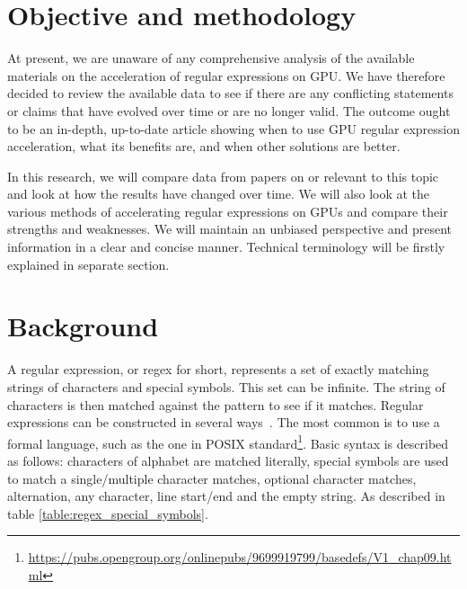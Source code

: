 \documentclass[10pt,onecolumn,twoside,english,a4paper]{article}
\begin{document}
\section{Objective and methodology} \label{Objective}
At present, we are unaware of any comprehensive analysis of the available materials on the acceleration of regular expressions on GPU. We have therefore decided to review the available data to see if there are any conflicting statements or claims that have evolved over time or are no longer valid. The outcome ought to be an in-depth, up-to-date article showing when to use GPU regular expression acceleration, what its benefits are, and when other solutions are better.

In this research, we will compare data from papers on or relevant to this topic and look at how the results have changed over time. We will also look at the various methods of accelerating regular expressions on GPUs and compare their strengths and weaknesses.
We will maintain an unbiased perspective and present information in a clear and concise manner. Technical terminology will be firstly explained in separate section.


\section{Background} \label{Background}
A regular expression, or regex for short, represents a set of exactly matching strings of characters and special symbols. This set can be infinite. The string of characters is then matched against the pattern to see if it matches. Regular expressions can be constructed in several ways~\cite{wang2014techniques}. The most common is to use a formal language, such as the one in POSIX standard\footnote{\url{https://pubs.opengroup.org/onlinepubs/9699919799/basedefs/V1_chap09.html}}.
Basic syntax is described as follows: characters of alphabet are matched literally, special symbols are used to match a single/multiple character matches, optional character matches, alternation, any character, line start/end and the empty string. As described in table \ref{table:regex_special_symbols}.
\end{document}

